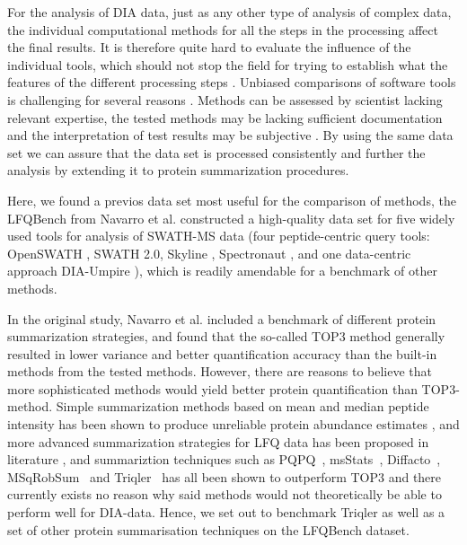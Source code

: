 \documentclass[10pt,letterpaper]{article}
\begin{document}
For the analysis of DIA data, just as any other type of analysis of complex data, the individual computational methods for all the steps in the processing affect the final results. It is therefore quite hard to evaluate the influence of the individual tools, which should not stop the field for trying to establish what the features of the different processing steps \cite{dufresne2014abrf,gatto2016testing,navarro2016multicenter}. Unbiased comparisons of software tools is challenging for several reasons \cite{dufresne2014abrf}. Methods can be assessed by scientist lacking relevant expertise, the tested methods may be lacking sufficient documentation and the interpretation of test results may be subjective \cite{yates2012toward} \cite{leprevost2014best} \cite{pak2013clustering} \cite{faircomparison2015}. By using the same data set we can assure that the data set is processed consistently and further the analysis by extending it to protein summarization procedures.


Here, we found a previos data set most useful for the comparison of methods, the LFQBench from Navarro et al. \cite{navarro2016multicenter} constructed a high-quality data set for five widely used tools for analysis of SWATH-MS data (four peptide-centric query tools: OpenSWATH \cite{rost2014openswath}, SWATH 2.0, Skyline \cite{maclean2010skyline}, Spectronaut \cite{bruderer2015extending}, and one data-centric approach DIA-Umpire \cite{maclean2010skyline}), which is readily amendable for a benchmark of other methods.

In the original study, Navarro et al. included a benchmark of different protein summarization strategies, and found that the so-called TOP3 method generally resulted in lower variance and better quantification accuracy than the built-in methods from the tested methods\cite{navarro2016multicenter}. However, there are reasons to believe that more sophisticated methods would yield better protein quantification than TOP3-method. Simple summarization methods based on mean and median peptide intensity has been shown to produce unreliable protein abundance estimates \cite{goeminne2015summarization}, and more advanced summarization strategies for LFQ data has been proposed in literature \cite{silva2006absolute,cox2014accurate}, and summariztion techniques such as PQPQ~\cite{forshed2011enhanced}, msStats~\cite{choi2014msstats}, Diffacto~\cite{zhang2017covariation}, MSqRobSum~\cite{sticker2020robust} and Triqler~\cite{The2018Integrated} has all been shown to outperform TOP3 and there currently exists no reason why said methods would not theoretically be able to perform well for DIA-data. Hence, we set out to benchmark Triqler as well as a set of other protein summarisation techniques on the LFQBench dataset.
 
\end{document}
